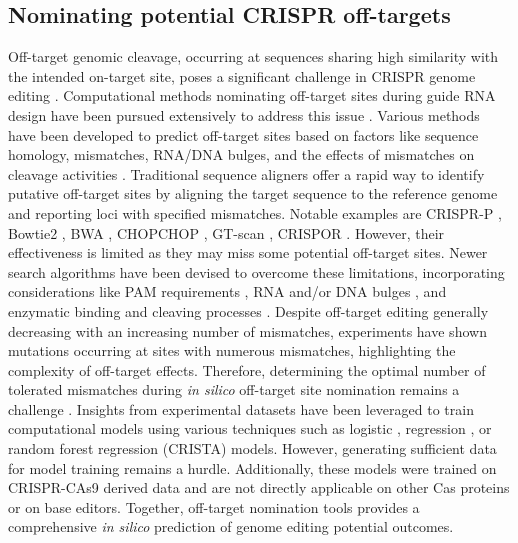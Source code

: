 \documentclass[a4paper, titlepage, openright]{book}
\begin{document}
\subsection{Nominating potential CRISPR off-targets}\label{subsection:offtarget-nomination}
Off-target genomic cleavage, occurring at sequences sharing high similarity with the intended on-target site, poses a significant challenge in CRISPR genome editing \citep{pattanayak2013high,cho2014analysis}. Computational methods nominating off-target sites during guide RNA design have been pursued extensively to address this issue \citep{hanna2020design}. Various methods have been developed to predict off-target sites based on factors like sequence homology, mismatches, RNA/DNA bulges, and the effects of mismatches on cleavage activities \citep{doench2014rational,doench2016optimized,sanson2018optimized}. Traditional sequence aligners offer a rapid way to identify putative off-target sites by aligning the target sequence to the reference genome and reporting loci with specified mismatches. Notable examples are CRISPR-P \citep{lei2014crispr}, Bowtie2 \citep{langmead2012fast}, BWA \citep{li2009fast}, CHOPCHOP \citep{montague2014chopchop}, GT-scan \citep{o2014gt}, CRISPOR \citep{haeussler2016evaluation}. However, their effectiveness is limited as they may miss some potential off-target sites. Newer search algorithms have been devised to overcome these limitations, incorporating considerations like PAM requirements \citep{xiao2014casot,zhu2014efficient}, RNA and/or DNA bulges \citep{bae2014cas,cancellieri2020crispritz}, and enzymatic binding and cleaving processes \citep{klein2018hybridization}. Despite off-target editing generally decreasing with an increasing number of mismatches, experiments have shown mutations occurring at sites with numerous mismatches, highlighting the complexity of off-target effects. Therefore, determining the optimal number of tolerated mismatches during \emph{in silico} off-target site nomination remains a challenge \citep{clement2020technologies}. Insights from experimental datasets have been leveraged to train computational models using various techniques such as logistic \citep{allen2019predicting}, regression \citep{listgarten2018prediction}, or random forest regression (CRISTA) \citep{abadi2017machine} models. However, generating sufficient data for model training remains a hurdle. Additionally, these models were trained on CRISPR-CAs9 derived data and are not directly applicable on other Cas proteins or on base editors. Together, off-target nomination tools provides a comprehensive \emph{in silico} prediction of genome editing potential outcomes.
\end{document}
